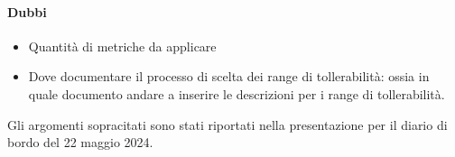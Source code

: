 \paragraph{Dubbi}
\begin{itemize}
	\item Quantità di metriche da applicare
	\item Dove documentare il processo di scelta dei range di tollerabilità: ossia in quale documento andare a inserire le descrizioni per i range di tollerabilità.
\end{itemize}

\par Gli argomenti sopracitati sono stati riportati nella presentazione per il diario di bordo del 22 maggio 2024.